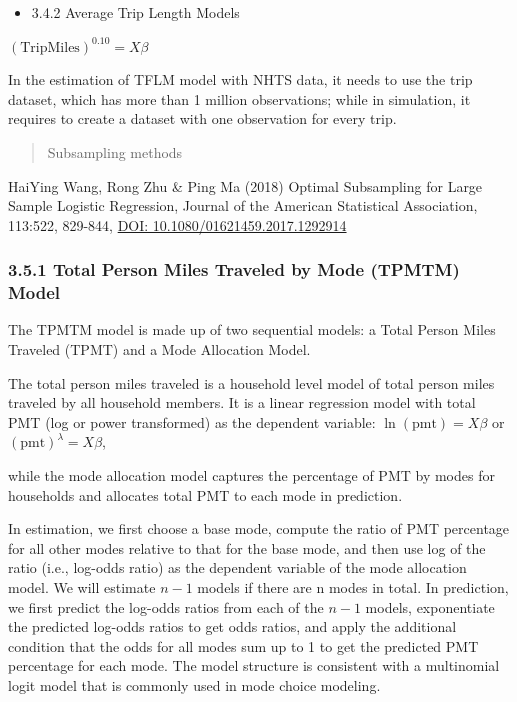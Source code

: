 \documentclass[
]{article}
\providecommand{\tightlist}{%
  \setlength{\itemsep}{0pt}\setlength{\parskip}{0pt}}
\begin{document}
\begin{itemize}
\tightlist
\item
  3.4.2 Average Trip Length Models
\end{itemize}

\((\text{TripMiles})^{0.10}=X\beta\)

In the estimation of TFLM model with NHTS data, it needs to use the trip
dataset, which has more than 1 million observations; while in
simulation, it requires to create a dataset with one observation for
every trip.

\begin{quote}
Subsampling methods
\end{quote}

HaiYing Wang, Rong Zhu \& Ping Ma (2018) Optimal Subsampling for Large
Sample Logistic Regression, Journal of the American Statistical
Association, 113:522, 829-844,
\href{https://doi.org/10.1080/01621459.2017.1292914}{DOI:
10.1080/01621459.2017.1292914}

\hypertarget{total-person-miles-traveled-by-mode-tpmtm-model}{%
\subsubsection{3.5.1 Total Person Miles Traveled by Mode (TPMTM)
Model}\label{total-person-miles-traveled-by-mode-tpmtm-model}}

The TPMTM model is made up of two sequential models: a Total Person
Miles Traveled (TPMT) and a Mode Allocation Model.

The total person miles traveled is a household level model of total
person miles traveled by all household members. It is a linear
regression model with total PMT (log or power transformed) as the
dependent variable: \(\ln(\text{pmt})=X\beta\) or
\((\text{pmt})^{\lambda}=X\beta\),

while the mode allocation model captures the percentage of PMT by modes
for households and allocates total PMT to each mode in prediction.

In estimation, we first choose a base mode, compute the ratio of PMT
percentage for all other modes relative to that for the base mode, and
then use log of the ratio (i.e., log-odds ratio) as the dependent
variable of the mode allocation model. We will estimate \(n-1\) models
if there are n modes in total. In prediction, we first predict the
log-odds ratios from each of the \(n-1\) models, exponentiate the
predicted log-odds ratios to get odds ratios, and apply the additional
condition that the odds for all modes sum up to 1 to get the predicted
PMT percentage for each mode. The model structure is consistent with a
multinomial logit model that is commonly used in mode choice modeling.
\end{document}
